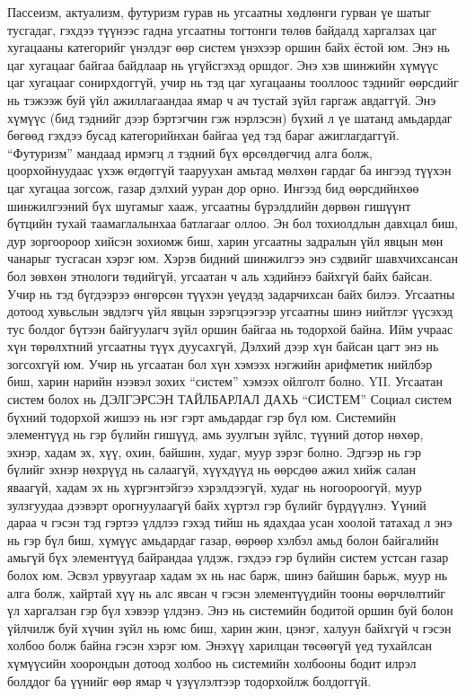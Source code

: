Пассеизм, актуализм, футуризм гурав нь угсаатны хөдлөнги гурван үе шатыг тусгадаг, гэхдээ түүнээс гадна угсаатны тогтонги төлөв байдалд харгалзах цаг хугацааны категорийг үнэлдэг өөр систем үнэхээр оршин байх ёстой юм. Энэ нь цаг хугацааг байгаа байдлаар нь үгүйсгэхэд оршдог. Энэ хэв шинжийн хүмүүс цаг хугацааг сонирхдоггүй, учир нь тэд цаг хугацааны тооллоос тэднийг өөрсдийг нь тэжээж буй үйл ажиллагаандаа ямар ч ач тустай зүйл гаргаж авдаггүй. Энэ хүмүүс (бид тэднийг дээр бэртэгчин гэж нэрлэсэн) бүхий л үе шатанд амьдардаг бөгөөд гэхдээ бусад категорийнхан байгаа үед тэд бараг ажиглагдаггүй. “Футуризм” мандаад ирмэгц л тэдний бүх өрсөлдөгчид алга болж, цоорхойнуудаас үхэж өгдөггүй тааруухан амьтад мөлхөн гардаг ба ингээд түүхэн цаг хугацаа зогсож, газар дэлхий ууран дор орно.
Ингээд бид өөрсдийнхөө шинжилгээний бүх шугамыг хааж, угсаатны бүрэлдлийн дөрвөн гишүүнт бүтцийн тухай таамаглалынхаа батлагааг оллоо. Эн бол тохиолдлын давхцал биш, дур зоргоороор хийсэн зохиомж биш, харин угсаатны задралын үйл явцын мөн чанарыг тусгасан хэрэг юм. Хэрэв бидний шинжилгээ энэ сэдвийг шавхчихсансан бол зөвхөн этнологи төдийгүй, угсаатан ч аль хэдийнээ байхгүй байх байсан. Учир нь тэд бүгдээрээ өнгөрсөн түүхэн үеүдэд задарчихсан байх билээ. Угсаатны дотоод хувьслын эвдлэгч үйл явцын зэрэгцээгээр угсаатны шинэ нийтлэг үүсэхэд тус болдог бүтээн байгуулагч зүйл оршин байгаа нь тодорхой байна. Ийм учраас хүн төрөлхтний угсаатны түүх дуусахгүй, Дэлхий дээр хүн байсан цагт энэ нь зогсохгүй юм. Учир нь угсаатан бол хүн хэмээх нэгжийн арифметик нийлбэр биш, харин нарийн нээвэл зохих “систем” хэмээх ойлголт болно.
YII. Угсаатан систем болох нь
ДЭЛГЭРСЭН ТАЙЛБАРЛАЛ ДАХЬ “СИСТЕМ”
Социал систем бүхний тодорхой жишээ нь нэг гэрт амьдардаг гэр бүл юм. Системийн элементүүд нь гэр бүлийн гишүүд, амь зуулгын зүйлс, түүний дотор нөхөр, эхнэр, хадам эх, хүү, охин, байшин, худаг, муур зэрэг болно. Эдгээр нь гэр бүлийг эхнэр нөхрүүд нь салаагүй, хүүхдүүд нь өөрсдөө ажил хийж салан яваагүй, хадам эх нь хүргэнтэйгээ хэрэлдээгүй, худаг нь ногоороогүй, муур зулзгуудаа дээвэрт орогнуулаагүй байх хүртэл гэр бүлийг бүрдүүлнэ. Үүний дараа ч гэсэн тэд гэртээ үлдлээ гэхэд тийш нь ядахдаа усан хоолой татахад л энэ нь гэр бүл биш, хүмүүс амьдардаг газар, өөрөөр хэлбэл амьд болон байгалийн амьгүй бүх элементүүд байрандаа үлдэж, гэхдээ гэр бүлийн систем устсан газар болох юм. Эсвэл урвуугаар хадам эх нь нас барж, шинэ байшин барьж, муур нь алга болж, хайртай хүү нь алс явсан ч гэсэн элементүүдийн тооны өөрчлөлтийг үл харгалзан гэр бүл хэвээр үлдэнэ. Энэ нь системийн бодитой оршин буй болон үйлчилж буй хүчин зүйл нь юмс биш, харин жин, цэнэг, халуун байхгүй ч гэсэн холбоо болж байна гэсэн хэрэг юм. Энэхүү харилцан төсөөгүй үед тухайлсан хүмүүсийн хоорондын дотоод холбоо нь системийн холбооны бодит илрэл болддог ба үүнийг өөр ямар ч үзүүлэлтээр тодорхойлж болдоггүй.
